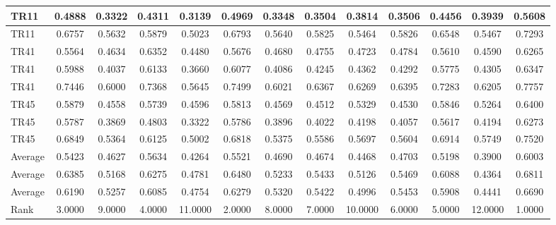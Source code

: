 \begin{tiny}
\begin{tabular}{|l|c|c|c|c|c|c|c|c|c|c|c|c|}
\textrm{TR11}&0.4888&0.3322&0.4311&0.3139&0.4969&0.3348&0.3504&0.3814&0.3506&0.4456&0.3939&0.5608\\\hline
\textrm{TR11}&0.6757&0.5632&0.5879&0.5023&0.6793&0.5640&0.5825&0.5464&0.5826&0.6548&0.5467&0.7293\\\hline
\textrm{TR41}&0.5564&0.4634&0.6352&0.4480&0.5676&0.4680&0.4755&0.4723&0.4784&0.5610&0.4590&0.6265\\\hline
\textrm{TR41}&0.5988&0.4037&0.6133&0.3660&0.6077&0.4086&0.4245&0.4362&0.4292&0.5775&0.4305&0.6347\\\hline
\textrm{TR41}&0.7446&0.6000&0.7368&0.5645&0.7499&0.6021&0.6367&0.6269&0.6395&0.7283&0.6205&0.7757\\\hline
\textrm{TR45}&0.5879&0.4558&0.5739&0.4596&0.5813&0.4569&0.4512&0.5329&0.4530&0.5846&0.5264&0.6400\\\hline
\textrm{TR45}&0.5787&0.3869&0.4803&0.3322&0.5786&0.3896&0.4022&0.4198&0.4057&0.5617&0.4194&0.6273\\\hline
\textrm{TR45}&0.6849&0.5364&0.6125&0.5002&0.6818&0.5375&0.5586&0.5697&0.5604&0.6914&0.5749&0.7520\\\hline
\textrm{Average}&0.5423&0.4627&0.5634&0.4264&0.5521&0.4690&0.4674&0.4468&0.4703&0.5198&0.3900&0.6003\\\hline
\textrm{Average}&0.6385&0.5168&0.6275&0.4781&0.6480&0.5233&0.5433&0.5126&0.5469&0.6088&0.4364&0.6811\\\hline
\textrm{Average}&0.6190&0.5257&0.6085&0.4754&0.6279&0.5320&0.5422&0.4996&0.5453&0.5908&0.4441&0.6690\\\hline
\textrm{Rank}&3.0000&9.0000&4.0000&11.0000&2.0000&8.0000&7.0000&10.0000&6.0000&5.0000&12.0000&1.0000\\\hline
\end{tabular}
\end{tiny}